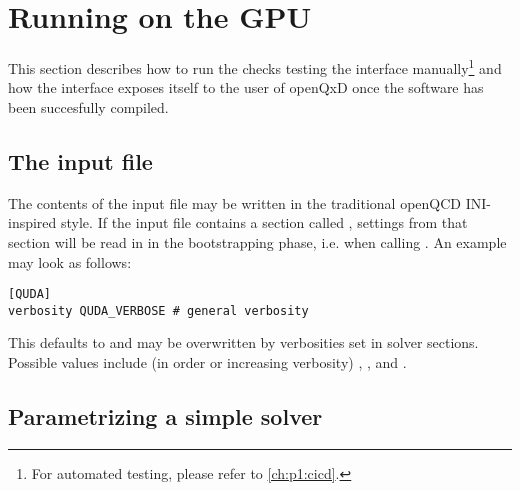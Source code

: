 \chapter{Running on the GPU}
\label{ch:p1:running}


This section describes how to run the checks testing the interface manually\footnote{For automated testing, please refer to \cref{ch:p1:cicd}.} and how the interface exposes itself to the user of openQxD once the software has been succesfully compiled.

\section{The input file}
\label{sec:running:infile}

The contents of the input file may be written in the traditional openQCD INI-inspired style.
If the input file contains a section called , settings from that section will be read in in the bootstrapping phase, i.e. when calling .
An example may look as follows:
\begin{verbatim}
[QUDA]
verbosity QUDA_VERBOSE # general verbosity
\end{verbatim}
This defaults to  and may be overwritten by verbosities set in solver sections.
Possible values include (in order or increasing verbosity) , ,  and .

\section{Parametrizing a simple solver}
\label{sec:running:solver}

